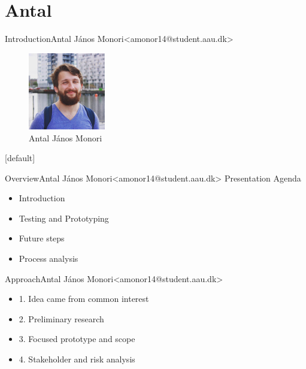 \section{Antal}
\begin{frame}{Introduction}{Antal János Monori\newline<amonor14@student.aau.dk>}
	\begin{figure}[h!]
		\includegraphics[width=0.3\textwidth]{images/anthony.jpg}
		\caption{Antal János Monori}
		\centering    		
	\end{figure}
\end{frame}

[default]

\begin{frame}{Overview}{Antal János Monori\newline<amonor14@student.aau.dk>}
	Presentation Agenda
	\begin{itemize}
		\item Introduction
		\item Testing and Prototyping
		\item Future steps
		\item Process analysis
	\end{itemize}
\end{frame}

\begin{frame}{Approach}{Antal János Monori\newline<amonor14@student.aau.dk>}
	\begin{itemize}
		\item <2-> 1. Idea came from common interest
		\item <3-> 2. Preliminary research
		\item <4-> 3. Focused prototype and scope
		\item <5-> 4. Stakeholder and risk analysis
	\end{itemize}
\end{frame}


